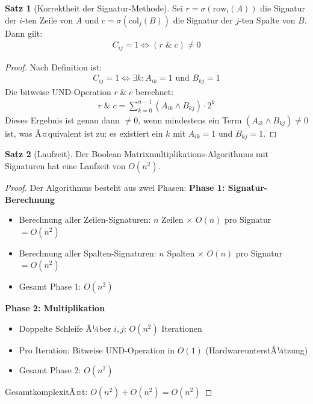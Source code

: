 ﻿\documentclass[a4paper,12pt]{article}
\theoremstyle{definition}
\newtheorem{satz}{Satz}
\begin{document}
	\begin{satz}[Korrektheit der Signatur-Methode]
		Sei $r = \sigma(\text{row}_i(A))$ die Signatur der $i$-ten Zeile von $A$ und $c = \sigma(\text{col}_j(B))$ die Signatur der $j$-ten Spalte von $B$. Dann gilt:
		\begin{align}
			C_{ij} = 1 \Leftrightarrow (r \; \& \; c) \neq 0
		\end{align}
	\end{satz}
	
	\begin{proof}
		Nach Definition ist:
		\begin{align}
			C_{ij} = 1 \Leftrightarrow \exists k: A_{ik} = 1 \text{ und } B_{kj} = 1
		\end{align}
		Die bitweise UND-Operation $r \; \& \; c$ berechnet:
		\begin{align}
			r \; \& \; c = \sum_{k=0}^{n-1} (A_{ik} \wedge B_{kj}) \cdot 2^k
		\end{align}
		Dieses Ergebnis ist genau dann $\neq 0$, wenn mindestens ein Term $(A_{ik} \wedge B_{kj}) \neq 0$ ist, was Ã¤quivalent ist zu: es existiert ein $k$ mit $A_{ik} = 1$ und $B_{kj} = 1$.
	\end{proof}
	
	\begin{satz}[Laufzeit]
		Der Boolean Matrixmultiplikations-Algorithmus mit Signaturen hat eine Laufzeit von $O(n^2)$.
	\end{satz}
	
	\begin{proof}
		Der Algorithmus besteht aus zwei Phasen:\newline	
		\textbf{Phase 1: Signatur-Berechnung}
		\begin{itemize}
			\item[-] Berechnung aller Zeilen-Signaturen: $n$ Zeilen $\times$ $O(n)$ pro Signatur $= O(n^2)$
			\item[-] Berechnung aller Spalten-Signaturen: $n$ Spalten $\times$ $O(n)$ pro Signatur $= O(n^2)$
			\item[-] Gesamt Phase 1: $O(n^2)$
		\end{itemize}
		\textbf{Phase 2: Multiplikation}
		\begin{itemize}
			\item[-] Doppelte Schleife Ã¼ber $i, j$: $O(n^2)$ Iterationen
			\item[-] Pro Iteration: Bitweise UND-Operation in $O(1)$ (HardwareunterstÃ¼tzung)
			\item[-] Gesamt Phase 2: $O(n^2)$
		\end{itemize}
		GesamtkomplexitÃ¤t: $O(n^2) + O(n^2) = O(n^2)$
	\end{proof}
	
\end{document}
